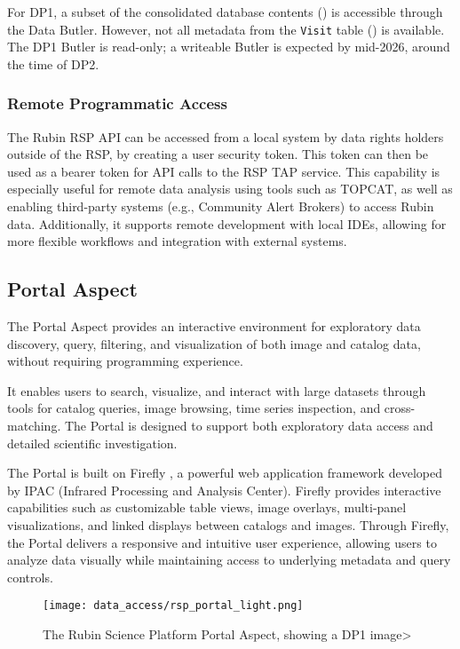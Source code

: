 For DP1, a subset of the consolidated database contents () is accessible through the Data Butler. However, not all metadata from the \texttt{Visit} table () is available. 
The DP1 Butler is read-only; a writeable Butler is expected by mid-2026, around the time of \gls{DP2}.

\subsubsection{Remote Programmatic Access
\label{sssec:remote_api}}
The Rubin RSP API can be accessed from a local system by data rights holders outside of the RSP, by creating a user security token. This token can then be used as a bearer token for API calls to the RSP TAP service.
This capability is especially useful for remote data analysis using tools such as TOPCAT, as well as enabling third-party systems (e.g., Community Alert Brokers) to access Rubin data. Additionally, it supports remote development with local IDEs, allowing for more flexible workflows and integration with external systems.

\subsection{Portal Aspect
\label{ssec:rsp_portal}}
The Portal Aspect provides an interactive environment for exploratory data discovery, query, filtering, and visualization of both image and catalog data,  without requiring programming experience.

It enables users to search, visualize, and interact with large datasets through tools for catalog queries, image browsing, time series inspection, and cross-matching. 
The Portal is designed to support both exploratory data access and detailed scientific investigation.

The Portal is built on \gls{Firefly} \citep{2019ASPC..521...32W}, a powerful web application framework developed by IPAC (Infrared Processing and Analysis Center). 
Firefly provides interactive capabilities such as customizable table views, image overlays, multi-panel visualizations, and linked displays between catalogs and images. 
Through Firefly, the Portal delivers a responsive and intuitive user experience, allowing users to analyze data visually while maintaining access to underlying metadata and query controls.
\begin{figure}[htb]
\centering
\texttt{[image: data\_access/rsp\_portal\_light.png]}
\caption{The Rubin Science Platform Portal Aspect, showing a DP1 image> }
\label{fig:rsp_portal}
\end{figure}

